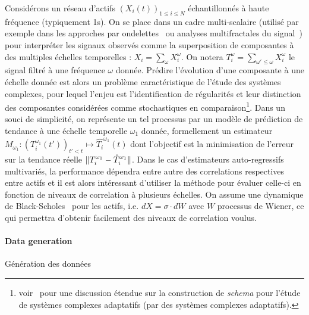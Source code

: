 {Considérons un réseau d'actifs $(X_i(t))_{1\leq i \leq N}$ échantillonnés à haute fréquence (typiquement 1s). On se place dans un cadre multi-scalaire (utilisé par exemple dans les approches par ondelettes~\cite{ramsey2002wavelets} ou analyses multifractales du signal~\cite{bouchaud2000apparent}) pour interpréter les signaux observés comme la superposition de composantes à des multiples échelles temporelles : $X_i=\sum_{\omega}{X_i^{\omega}}$. On notera $T_i^{\omega} = \sum_{\omega' \leq \omega} X_i^{\omega}$ le signal filtré à une fréquence $\omega$ donnée. Prédire l'évolution d'une composante à une échelle donnée est alors un problème caractéristique de l'étude des systèmes complexes, pour lequel l'enjeu est l'identification de régularités et leur distinction des composantes considérées comme stochastiques en comparaison\footnote{voir~\cite{gell1995quark} pour une discussion étendue sur la construction de \emph{schema} pour l'étude de systèmes complexes adaptatifs (par des systèmes complexes adaptatifs).}. Dans un souci de simplicité, on représente un tel processus par un modèle de prédiction de tendance à une échelle temporelle $\omega_1$ donnée, formellement un estimateur $M_{\omega_1} : (T_i^{\omega_1}(t'))_{t'<t} \mapsto \hat{T_i}^{\omega_1}(t)$ dont l'objectif est la minimisation de l'erreur sur la tendance réelle $\| T_i^{\omega_1} - \hat{T}_i^{\omega_1} \|$. Dans le cas d'estimateurs auto-regressifs multivariés, la performance dépendra entre autre des correlations respectives entre actifs et il est alors intéressant d'utiliser la méthode pour évaluer celle-ci en fonction de niveaux de correlation à plusieurs échelles. On assume une dynamique de Black-Scholes~\cite{jarrow1999honor} pour les actifs, i.e. $dX = \sigma\cdot dW$ avec $W$ processus de Wiener, ce qui permettra d'obtenir facilement des niveaux de correlation voulus.
}


\paragraph{Data generation}{Génération des données}


